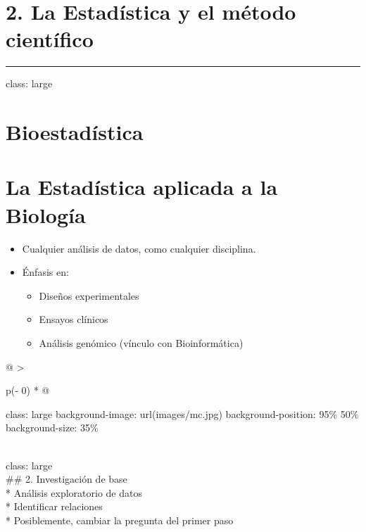 \documentclass[
]{book}
\providecommand{\tightlist}{%
  \setlength{\itemsep}{0pt}\setlength{\parskip}{0pt}}
\begin{document}
\hypertarget{la-estaduxedstica-y-el-muxe9todo-cientuxedfico}{%
\section{2. La Estadística y el método científico}\label{la-estaduxedstica-y-el-muxe9todo-cientuxedfico}}

\begin{center}\rule{0.5\linewidth}{0.5pt}\end{center}

class: large

\hypertarget{bioestaduxedstica}{%
\section{Bioestadística}\label{bioestaduxedstica}}

\hypertarget{la-estaduxedstica-aplicada-a-la-biologuxeda}{%
\section{La Estadística aplicada a la Biología}\label{la-estaduxedstica-aplicada-a-la-biologuxeda}}

\begin{itemize}
\item
  Cualquier análisis de datos, como cualquier disciplina.
\item
  Énfasis en:

  \begin{itemize}
  \tightlist
  \item
    Diseños experimentales
  \item
    Ensayos clínicos
  \item
    Análisis genómico (vínculo con Bioinformática)
  \end{itemize}
\end{itemize}

\begin{longtable}[]{@{}
  >{\raggedright\arraybackslash}p{(\columnwidth - 0\tabcolsep) * }@{}}
\toprule
\begin{minipage}[b]{\linewidth}\raggedright
class: large
background-image: url(images/mc.jpg)
background-position: 95\% 50\%
background-size: 35\%
\end{minipage} \\
\midrule
\endhead
class: large \\
\#\# 2. Investigación de base \\
* Análisis exploratorio de datos \\
* Identificar relaciones \\
* Posiblemente, cambiar la pregunta del primer paso \\
\bottomrule
\end{longtable}
\end{document}
